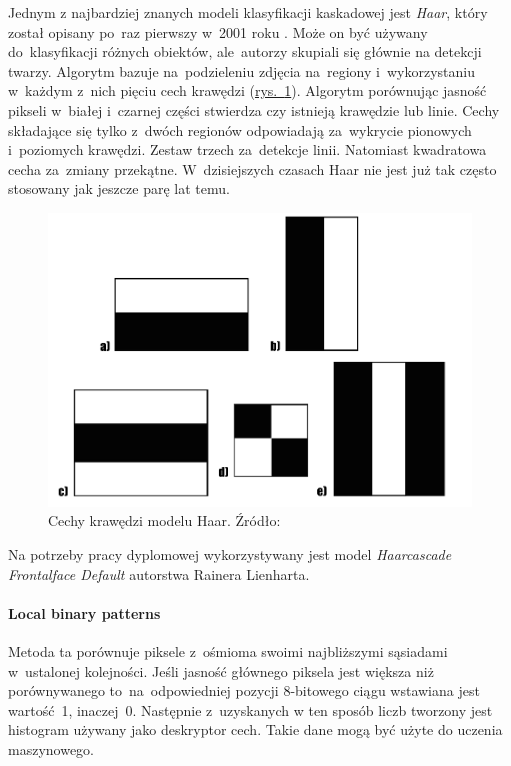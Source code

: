 Jednym z najbardziej znanych modeli klasyfikacji kaskadowej jest \textit{Haar}, który został opisany po~raz pierwszy w~2001 roku \cite{haar_proceeding}. Może on być używany do~klasyfikacji różnych obiektów, ale~autorzy skupiali się głównie na detekcji twarzy. Algorytm \cite{haar_towards} \cite{haar_pyimage} \cite{OBUKHOV2011517} bazuje na~podzieleniu zdjęcia na~regiony i~wykorzystaniu w~każdym z~nich pięciu cech krawędzi (\hyperref[{fig:haar_features}]{rys.~\ref{fig:haar_features}}). Algorytm porównując jasność pikseli w~białej i~czarnej części stwierdza czy istnieją krawędzie lub linie. Cechy składające się tylko z~dwóch regionów odpowiadają za~wykrycie pionowych i~poziomych krawędzi. Zestaw trzech za~detekcje linii. Natomiast kwadratowa cecha za~zmiany przekątne. W~dzisiejszych czasach Haar nie jest już tak często stosowany jak jeszcze parę lat temu.

\begin{figure}[!h]
    \begin{center}
        \includegraphics[scale=0.2]{img/face_section/haar_features.png}
        \caption{Cechy krawędzi modelu Haar. Źródło: \cite{haar_towards}}
        \label{fig:haar_features}
    \end{center}
\end{figure}

Na potrzeby pracy dyplomowej wykorzystywany jest model \textit{Haarcascade Frontalface Default} \cite{haar_frontal} autorstwa Rainera Lienharta.



\paragraph{Local binary patterns}
Metoda ta porównuje piksele z~ośmioma swoimi najbliższymi sąsiadami w~ustalonej kolejności. Jeśli jasność głównego piksela jest większa niż porównywanego to~na~odpowiedniej pozycji 8-bitowego ciągu wstawiana jest wartość~1, inaczej~0. Następnie z~uzyskanych w ten sposób liczb tworzony jest histogram używany jako deskryptor cech. Takie dane mogą być użyte do uczenia maszynowego. \cite{comp_haar_lbp}

